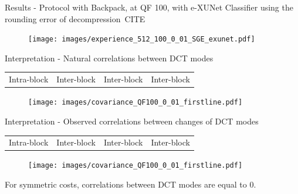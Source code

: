 \documentclass[10pt]{beamer}
\begin{document}
\begin{frame}{Results - Protocol with Backpack, at QF 100, with e-XUNet}
Classifier using the rounding error of decompression~CITE
    \begin{figure}[h]
        \texttt{[image: images/experience\_512\_100\_0\_01\_SGE\_exunet.pdf]}
    \end{figure}
\end{frame}


\begin{frame}{Interpretation - Natural correlations between DCT modes}
    \begin{tabularx}{0.9\textwidth} { 
        >{\centering\arraybackslash}X 
        >{\centering\arraybackslash}X 
        >{\centering\arraybackslash}X
        >{\centering\arraybackslash}X  }
        Intra-block & Inter-block & Inter-block & Inter-block \\ 
   \end{tabularx}

    \begin{figure}[h]
        \texttt{[image: images/covariance\_QF100\_0\_01\_firstline.pdf]}
    \end{figure}
\end{frame}


\begin{frame}{Interpretation - Observed correlations between changes of DCT modes}
        

    \begin{tabularx}{0.9\textwidth} { 
         >{\centering\arraybackslash}X 
         >{\centering\arraybackslash}X 
         >{\centering\arraybackslash}X
         >{\centering\arraybackslash}X  }
         Intra-block & Inter-block & Inter-block & Inter-block \\ 
    \end{tabularx}

    \begin{figure}[h]
        \texttt{[image: images/covariance\_QF100\_0\_01\_firstline.pdf]}
    \end{figure}

    \pause

    For symmetric costs, correlations between DCT modes are equal to 0. 
    
\end{frame}
\end{document}
